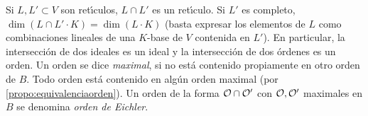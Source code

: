 Si $L,L'\subset V$ son ret\'{\i}culos, $L\cap L'$ es un ret\'{\i}culo. Si
$L'$ es completo,
\begin{math}
	\dim(L\cap L'\cdot K) =\dim(L\cdot K)
\end{math}
%
(basta expresar los elementos de $L$ como combinaciones lineales de una
$K$-base de $V$ contenida en $L'$).
%
En particular, la intersecci\'{o}n de dos
ideales es un ideal y la intersecci\'{o}n de dos \'{o}rdenes es un orden. Un
orden se dice \emph{maximal}, si no est\'{a} contenido
propiamente en otro orden de $B$. Todo orden est\'{a} contenido en alg\'{u}n
orden maximal (por \ref{propo:equivalenciaorden}). Un orden de la forma
$\cal{O}\cap\cal{O}'$ con $\cal{O},\cal{O}'$ maximales en $B$ se denomina
\emph{orden de Eichler}.

